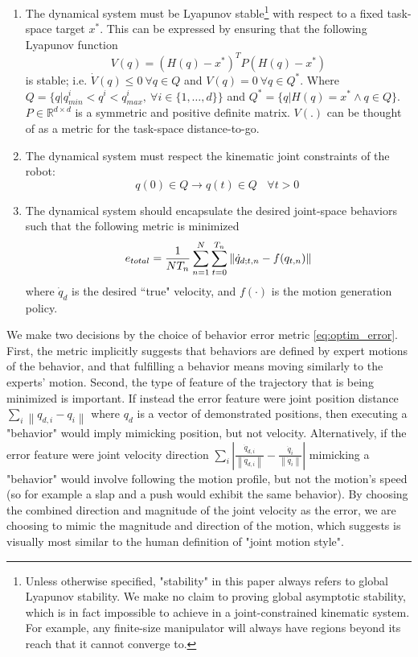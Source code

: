\documentclass[letterpaper, 10 pt, conference,fleqn]{ieeeconf}
\begin{document}
\begin{enumerate}
\item The dynamical system must be Lyapunov stable\footnote{Unless otherwise specified, "stability" in this paper always refers to global Lyapunov stability. We make no claim to proving global asymptotic stability, which is in fact impossible to achieve in a joint-constrained kinematic system. For example, any finite-size manipulator will always have regions beyond its reach that it cannot converge to.} with respect to a fixed task-space target $x^*$. This can be expressed by ensuring that the following Lyapunov function
\begin{equation}
V(q) = (H(q) - x^*)^TP(H(q) - x^*) 
\label{eq:Lyp}
\end{equation}
is stable; i.e. $\dot{V}(q)\leq0 ~\forall q\in Q$ and $V(q)=0~ \forall q\in Q^*$. Where  $Q=\{q|q^i_{min} < q^i < q^i_{max},~\forall i\in \{1,\dots,d\}\}$ and $Q^*=\{q|H(q)=x^*\wedge q\in Q\}$. $P\in \mathbb{R}^{d\times d} $ is a symmetric and positive definite matrix. $V(.)$ can be thought of as a metric for the task-space distance-to-go.
\item The dynamical system must respect the kinematic joint constraints of the robot:
\begin{equation}
q(0)\in Q \rightarrow q(t)\in Q~~~~\forall t>0~
\end{equation}
\item The dynamical system should encapsulate the desired joint-space behaviors such that the following metric is minimized
\begin{equation}
\vspace{-5pt}
e_{total} = \frac{1}{NT_n}\sum_{n=1}^N\sum_{t=0}^{T_n} \left \| \dot{q}_{d; t,n} - f(q_{t,n}) \right \|
\label{eq:optim_error}
\end{equation}
  where $\dot{q}_d$ is the desired ``true" velocity, and $f(\cdot)$ is the motion generation policy.
\end{enumerate}

We make two decisions by the choice of behavior error metric \eqref{eq:optim_error}. First, the metric implicitly suggests that behaviors are defined by expert motions of the behavior, and that fulfilling a behavior means moving similarly to the experts' motion. Second, the type of feature of the trajectory that is being minimized is important. If instead the error feature were joint position distance $\sum_i\left \| q_{d,i} - q_i \right \|$ where $q_d$ is a vector of demonstrated positions, then executing a "behavior" would imply mimicking position, but not velocity. Alternatively, if the error feature were joint velocity direction $\sum_i \left | \frac{\dot{q}_{d,i}}{\left \| \dot{q}_{d,i} \right \|} - \frac{\dot{q}_i}{\left \| \dot{q}_i \right \|} \right |$ mimicking a "behavior" would involve following the motion profile, but not the motion's speed (so for example a slap and a push would exhibit the same behavior). By choosing the combined direction and magnitude of the joint velocity as the error, we are choosing to mimic the magnitude and direction of the motion, which \cite{gielniak2010stylized} suggests is visually most similar to the human definition of "joint motion style".
\end{document}
